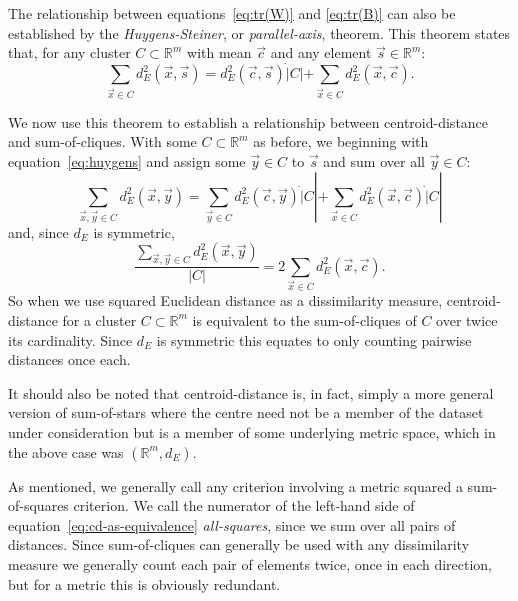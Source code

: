 The relationship between equations~\eqref{eq:tr(W)} and \eqref{eq:tr(B)} can
also be established by the \textit{Huygens-Steiner}, or
\textit{parallel-axis}, theorem.  This theorem states that, for any cluster $C
\subset \mathbb{R}^m$ with mean $\vec{c}$ and any element $\vec{s} \in
\mathbb{R}^m$:
\begin{equation}
  \label{eq:huygens}
  \sum_{\vec{x} \in C} d_E^2(\vec{x},\vec{s}) = d_E^2(\vec{c},\vec{s}) \dot |C| +
                             \sum_{\vec{x} \in C} d_E^2(\vec{x},\vec{c}).
\end{equation}

We now use this theorem to establish a relationship between centroid-distance
and sum-of-cliques.  With some $C \subset \mathbb{R}^m$ as before, we
beginning with equation~\eqref{eq:huygens} and assign some $\vec{y} \in C$ to
$\vec{s}$ and sum over all $\vec{y} \in C$:
\begin{equation*}
  \sum_{\vec{x},\vec{y} \in C} d_E^2(\vec{x},\vec{y}) = \sum_{\vec{y} \in C}
  d_E^2(\vec{c},\vec{y}) \dot |C| 
  + \sum_{\vec{x} \in C} d_E^2(\vec{x},\vec{c}) \dot |C|
\end{equation*}
and, since $d_E$ is symmetric,
\begin{equation}
  \label{eq:cd-as-equivalence}
  \frac{\displaystyle \sum_{\vec{x},\vec{y} \in C} d_E^2(\vec{x},\vec{y})}
       {|C|}
  = 2 \sum_{\vec{x} \in C} d_E^2(\vec{x},\vec{c}).
\end{equation}
So when we use squared Euclidean distance as a dissimilarity measure,
centroid-distance for a cluster $C \subset \mathbb{R}^m$ is equivalent to the
sum-of-cliques of $C$ over twice its cardinality.  Since $d_E$ is symmetric
this equates to only counting pairwise distances once each.

It should also be noted that centroid-distance is, in fact, simply a more
general version of sum-of-stars where the centre need not be a member of the
dataset under consideration but is a member of some underlying metric space,
which in the above case was $(\mathbb{R}^m,d_E)$.

As mentioned, we generally call any criterion involving a metric squared a
sum-of-squares criterion.  We call the numerator of the left-hand side of
equation~\eqref{eq:cd-as-equivalence} \textit{all-squares}, since we sum over
all pairs of distances.  Since sum-of-cliques can generally be used with any
dissimilarity measure we generally count each pair of elements twice, once in
each direction, but for a metric this is obviously redundant.

